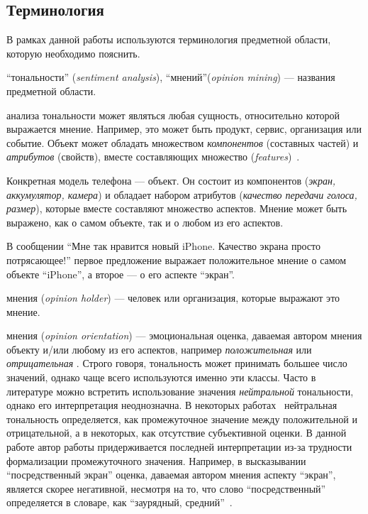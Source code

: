 \subsection{Терминология}

 В рамках данной работы используются терминология предметной области, которую необходимо пояснить.

``{ тональности}'' (\textit{sentiment analysis}), ``{ мнений}''(\textit{opinion mining}) --- названия предметной области.

{} анализа тональности может являться любая сущность, относительно которой выражается мнение. Например, это может быть продукт, сервис, организация или событие. Объект может обладать множеством \textit{компонентов} (составных частей) и \textit{атрибутов} (свойств), вместе составляющих множество {} (\textit{features})~\cite{multi_faceted}.

Конкретная модель телефона --- объект. Он состоит из компонентов (\textit{экран, аккумулятор, камера}) и обладает набором атрибутов (\textit{качество передачи голоса, размер}), которые вместе составляют множество аспектов. Мнение может быть выражено, как о самом объекте, так и о любом из его аспектов.

В сообщении ``Мне так нравится новый iPhone. Качество экрана просто потрясающее!'' первое предложение выражает положительное мнение о самом объекте ``iPhone'', а второе --- о его аспекте ``экран''.

{ мнения} (\textit{opinion holder}) --- человек или организация, которые выражают это мнение. 

{ мнения} (\textit{opinion orientation}) --- эмоциональная оценка, даваемая автором мнения объекту и/или любому из его аспектов, например \textit{положительная} или \textit{отрицательная} . Строго говоря, тональность может принимать большее число значений, однако чаще всего используются именно эти классы. Часто в литературе можно встретить использование значения \textit{нейтральной} тональности, однако его интерпретация неоднозначна. 
В некоторых работах~\cite{panglee} нейтральная тональность определяется, как промежуточное значение между положительной и отрицательной, а в некоторых, как отсутствие субъективной оценки. В данной работе автор работы придерживается последней интерпретации из-за трудности формализации промежуточного значения. Например, в высказывании ``посредственный экран'' оценка, даваемая автором мнения аспекту ``экран'', является скорее негативной, несмотря на то, что слово ``посредственный'' определяется в словаре, как ``заурядный, средний''~\cite{wiki_middling}.

